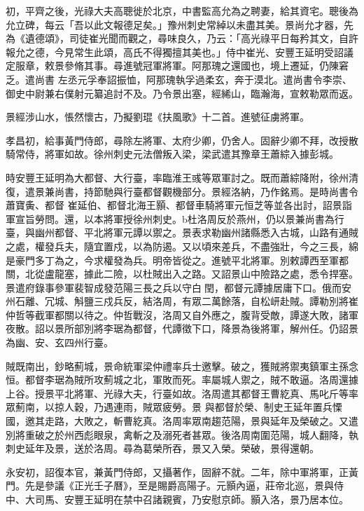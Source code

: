 \begin{pinyinscope}
 初，平齊之後，光祿大夫高聰徙於北京，中書監高允為之聘妻，給其資宅。聰後為允立碑，每云「吾以此文報德足矣。」豫州刺史常綽以未盡其美。景尚允才器，先為《遺德頌》，司徒崔光聞而觀之，尋味良久，乃云：「高光祿平日每矜其文，自許報允之德，今見常生此頌，高氏不得獨擅其美也。」侍中崔光、安豐王延明受詔議定服章，敕景參脩其事。尋進號冠軍將軍。阿那瑰之還國也，境上遷延，仍陳窘乏。遣尚書
 左丞元孚奉詔振恤，阿那瑰執孚過柔玄，奔于漠北。遣尚書令李崇、御史中尉兼右僕射元纂追討不及。乃令景出塞，經絺山，臨瀚海，宣敕勒眾而返。



 景經涉山水，悵然懷古，乃擬劉琨《扶風歌》十二首。進號征虜將軍。



 孝昌初，給事黃門侍郎，尋除左將軍、太府少卿，仍舍人。固辭少卿不拜，改授散騎常侍，將軍如故。徐州刺史元法僧叛入梁，梁武遣其豫章王蕭綜入據彭城。



 時安豐王延明為大都督、大行臺，率臨淮王彧等眾軍討之。既而蕭綜降附，徐州清復，遣景兼尚書，持節馳與行臺都督觀機部分。景經洛納，乃作銘焉。是時尚書令蕭寶夤、都督
 崔延伯、都督北海王顥、都督車騎將軍元恒芝等並各出討，詔景詣軍宣旨勞問。還，以本將軍授徐州刺史。b杜洛周反於燕州，仍以景兼尚書為行臺，與幽州都督、平北將軍元譚以禦之。景表求勒幽州諸縣悉入古城，山路有通賊之處，權發兵夫，隨宜置戍，以為防遏。又以頃來差兵，不盡強壯，今之三長，綿是豪門多丁為之，今求權發為兵。明帝皆從之。進號平北將軍。別敕譚西至軍都關，北從盧龍塞，據此二險，以杜賊出入之路。又詔景山中險路之處，悉令捍塞。景遣府錄事參軍裴智成發范陽三長之兵以守白閏，都督元譚據居庸下口。俄而安
 州石離、冗城、斛鹽三戍兵反，結洛周，有眾二萬餘落，自松岍赴賊。譚勒別將崔仲哲等截軍都關以待之。仲哲戰沒，洛周又自外應之，腹背受敵，譚遂大敗，諸軍夜散。詔以景所部別將李琚為都督，代譚徵下口，降景為後將軍，解州任。仍詔景為幽、安、玄四州行臺。



 賊既南出，鈔略薊城，景命統軍梁仲禮率兵士邀擊。破之，獲賊將禦夷鎮軍主孫念恒。都督李琚為賊所攻薊城之北，軍敗而死。率屬城人禦之，賊不敢逼。洛周還據上谷。授景平北將軍、光祿大夫，行臺如故。洛周遣其都督王曹紇真、馬叱斤等率眾薊南，以掠人穀，乃遇連雨，賊眾疲勞。景
 與都督於榮、制史王延年置兵慄國，邀其走路，大敗之，斬曹紇真。洛周率眾南趨范陽，景與延年及榮破之。又遣別將重破之於州西彪眼泉，禽斬之及溺死者甚眾。後洛周南圍范陽，城人翻降，執刺史延年及景，送於洛周。尋為葛榮所吞，景又入榮。榮破，景得還朝。



 永安初，詔復本官，兼黃門侍郎，又攝著作，固辭不就。二年，除中軍將軍，正黃門。先是參議《正光壬子曆》，至是賜爵高陽子。元顥內逼，莊帝北巡，景與侍中、大司馬、安豐王延明在禁中召諸親賓，乃安慰京師。顥入洛，景乃居本位。




\end{pinyinscope}
